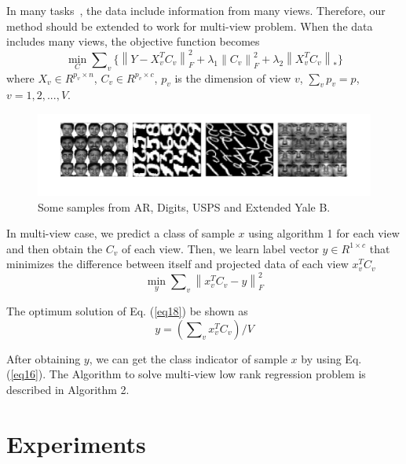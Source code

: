 \documentclass{ieeeaccess}
\begin{document}
In many tasks~\cite{ref36,ref37,ref38}, the data include information from many views. Therefore, our method should be extended to work for multi-view problem. When the data includes many views, the objective function becomes
\begin{equation}\label{eq17}
\mathop {\min }\limits_C  \sum\nolimits_v {\{ \left\| {Y - X_v^T{C _v}} \right\|_F^2 + {\lambda _1}\left\| {{C _v}} \right\|_F^2 + {\lambda _2}{{\left\| {X_v^T{C _v}} \right\|}_*}\} }
\end{equation}
where ${X_v} \in {R^{{p_v} \times n}}$, ${C _v} \in {R^{{p_v} \times c}}$, ${p_v}$ is the dimension of view $v$, $\sum\nolimits_v {{p_v}}  = p$, $v = 1,2,...,V$.

\begin{figure}[!t]
  \centering
  \includegraphics[width=16cm]{dataset}
  \caption{Some samples from AR, Digits, USPS and Extended Yale B.}\label{fig1}
\end{figure}

In multi-view case, we predict a class of sample $x$ using algorithm 1 for each view and then obtain the ${C _v}$ of each view. Then, we learn label vector $y \in {R^{1 \times c}}$ that minimizes the difference between itself and projected data of each view $x_v^T{C _v}$
\begin{equation}\label{eq18}
\mathop {\min }\limits_y \sum\nolimits_v {\left\| {x_v^T{C _v} - y} \right\|} _F^2
\end{equation}


The optimum solution of Eq. (\ref{eq18}) be shown as
\begin{equation}\label{eq19}
y = \left( {\sum\nolimits_v {x_v^T} {C _v}} \right)/V
\end{equation}

After obtaining $y$, we can get the class indicator of sample $x$ by using Eq. (\ref{eq16}). The Algorithm to solve multi-view low rank regression problem is described in Algorithm 2.



\section{Experiments}
\end{document}
